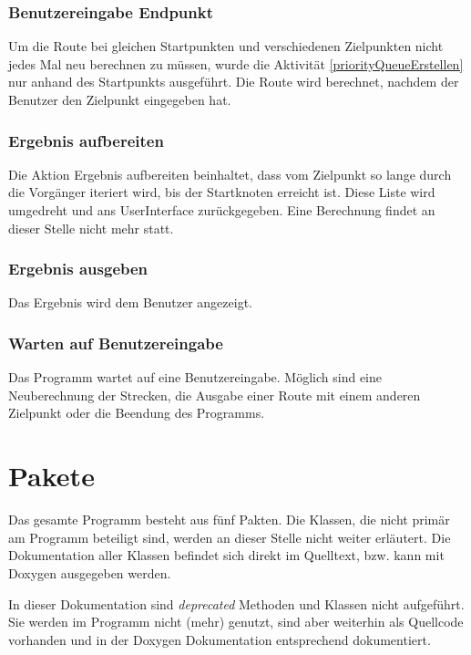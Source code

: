 \documentclass[12pt, a4paper, ngerman]{article}
\begin{document}

\subsubsection{Benutzereingabe Endpunkt}
Um die Route bei gleichen Startpunkten und verschiedenen Zielpunkten nicht jedes Mal neu berechnen zu müssen, wurde die Aktivität \ref{priorityQueueErstellen} nur anhand des Startpunkts ausgeführt. Die Route wird berechnet, nachdem der Benutzer den Zielpunkt eingegeben hat.

\subsubsection{Ergebnis aufbereiten}
Die Aktion Ergebnis aufbereiten beinhaltet, dass vom Zielpunkt so lange durch die Vorgänger iteriert wird, bis der Startknoten erreicht ist. Diese Liste wird umgedreht und ans UserInterface zurückgegeben. Eine Berechnung findet an dieser Stelle nicht mehr statt.

\subsubsection{Ergebnis ausgeben}
Das Ergebnis wird dem Benutzer angezeigt.

\subsubsection{Warten auf Benutzereingabe}
Das Programm wartet auf eine Benutzereingabe. Möglich sind eine Neuberechnung der Strecken, die Ausgabe einer Route mit einem anderen Zielpunkt oder die Beendung des Programms.

\section{Pakete}
Das gesamte Programm besteht aus fünf Pakten. Die Klassen, die nicht primär am Programm beteiligt sind, werden an dieser Stelle nicht weiter erläutert. Die Dokumentation aller Klassen befindet sich direkt im Quelltext, bzw. kann mit Doxygen ausgegeben werden.

In dieser Dokumentation sind \textit{deprecated} Methoden und Klassen nicht aufgeführt. Sie werden im Programm nicht (mehr) genutzt, sind aber weiterhin als Quellcode vorhanden und in der Doxygen Dokumentation entsprechend  dokumentiert.
\end{document}
